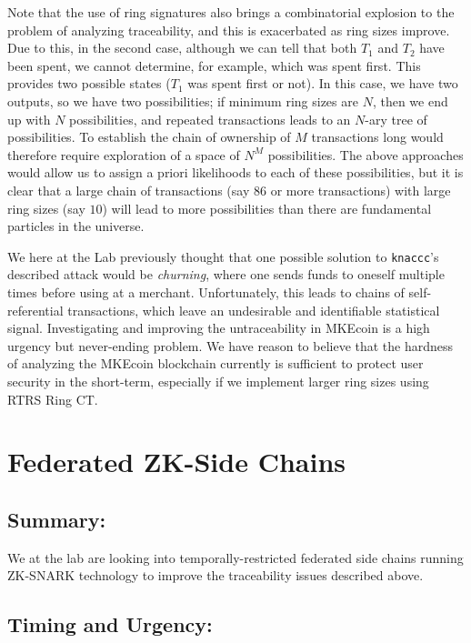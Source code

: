 \documentclass[12pt,english]{mrl}
\theoremstyle{definition}
\numberwithin{equation}{section}
\numberwithin{figure}{section}
\numberwithin{equation}{section}
\numberwithin{equation}{section}
\numberwithin{figure}{section}
\begin{document}
Note that the use of ring signatures also brings a combinatorial explosion to the problem of analyzing traceability, and this is exacerbated as ring sizes improve. Due to this, in the second case, although we can tell that both $T_1$ and $T_2$ have been spent, we cannot determine, for example, which was spent first. This provides two possible states ($T_1$ was spent first or not). In this case, we have two outputs, so we have two possibilities; if minimum ring sizes are $N$, then we end up with $N$ possibilities, and repeated transactions leads to an $N$-ary tree of possibilities. To establish the chain of ownership of $M$ transactions long would therefore require exploration of a space of $N^M$ possibilities. The above approaches would allow us to assign a priori likelihoods to each of these possibilities, but it is clear that a large chain of transactions (say $86$ or more transactions) with large ring sizes (say $10$) will lead to more possibilities than there are fundamental particles in the universe.

We here at the Lab previously thought that one possible solution to \texttt{knaccc}'s described attack would be \textit{churning}, where one sends funds to oneself multiple times before using at a merchant. Unfortunately, this leads to chains of self-referential transactions, which leave an undesirable and identifiable statistical signal.  Investigating and improving the untraceability in MKEcoin is a high urgency but never-ending problem. We have reason to believe that the hardness of analyzing the MKEcoin blockchain currently is sufficient to protect user security in the short-term, especially if we implement larger ring sizes using RTRS Ring CT.




\section{Federated ZK-Side Chains}


\subsection{Summary:} 

We at the lab are looking into temporally-restricted federated side chains running ZK-SNARK technology to improve the traceability issues described above. 

\subsection{Timing and Urgency:} 
\end{document}
